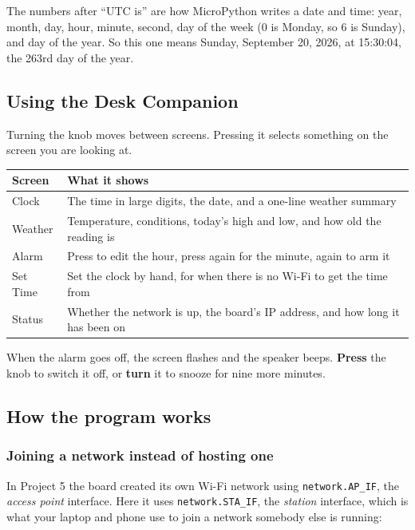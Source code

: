 The numbers after ``UTC is'' are how MicroPython writes a date and time: year, month, day, hour,
minute, second, day of the week (0 is Monday, so 6 is Sunday), and day of the year. So this one
means Sunday, September 20, 2026, at 15:30:04, the 263rd day of the year.

\subsection{Using the Desk Companion}
Turning the knob moves between screens. Pressing it selects something on the screen you are
looking at.

\begin{center}
\begin{tabular}{|l|l|}
    \hline
    \textbf{Screen} & \textbf{What it shows} \\
    \hline
    Clock    & The time in large digits, the date, and a one-line weather summary \\
    Weather  & Temperature, conditions, today's high and low, and how old the reading is \\
    Alarm    & Press to edit the hour, press again for the minute, again to arm it \\
    Set Time & Set the clock by hand, for when there is no Wi-Fi to get the time from \\
    Status   & Whether the network is up, the board's IP address, and how long it has been on \\
    \hline
\end{tabular}
\end{center}

When the alarm goes off, the screen flashes and the speaker beeps. \textbf{Press} the knob to
switch it off, or \textbf{turn} it to snooze for nine more minutes.

\subsection{How the program works}

\subsubsection{Joining a network instead of hosting one}
In Project 5 the board created its own Wi-Fi network using \texttt{network.AP\_IF}, the
\emph{access point} interface. Here it uses \texttt{network.STA\_IF}, the \emph{station} interface,
which is what your laptop and phone use to join a network somebody else is running:

